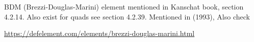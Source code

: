 
BDM (Brezzi-Douglas-Marini) element mentioned in Kanschat book, section 4.2.14. 
Also exist for quads see section 4.2.39.
Mentioned in \textcite{chen93a} (1993), Also check \textcite{brfo}

\url{https://defelement.com/elements/brezzi-douglas-marini.html}
